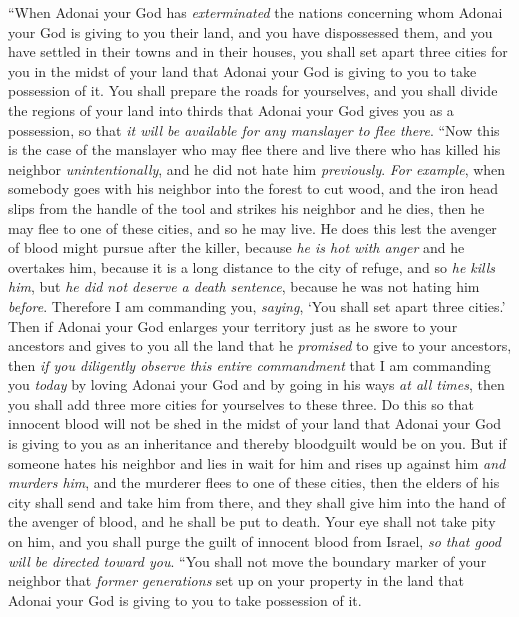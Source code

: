 \begin{biblechapter} %
\verse “When Adonai your God has \textit{exterminated} the nations concerning whom Adonai your God is giving to you their land, and you have dispossessed them, and you have settled in their towns and in their houses,
\verse you shall set apart three cities for you in the midst of your land that Adonai your God is giving to you to take possession of it.
\verse You shall prepare the roads for yourselves, and you shall divide the regions of your land into thirds that Adonai your God gives you as a possession, so that \textit{it will be available for any manslayer to flee there}.
\verse “Now this is the case of the manslayer who may flee there and live there who has killed his neighbor \textit{unintentionally}, and he did not hate him \textit{previously}.
\verse \textit{For example}, when somebody goes with his neighbor into the forest to cut wood, and the iron head slips from the handle of the tool and strikes his neighbor and he dies, then he may flee to one of these cities, and so he may live.
\verse He does this lest the avenger of blood might pursue after the killer, because \textit{he is hot with anger} and he overtakes him, because it is a long distance to the city of refuge, and so \textit{he kills him}, but \textit{he did not deserve a death sentence}, because he was not hating him \textit{before}.
\verse Therefore I am commanding you, \textit{saying}, ‘You shall set apart three cities.’
\verse Then if Adonai your God enlarges your territory just as he swore to your ancestors and gives to you all the land that he \textit{promised} to give to your ancestors,
\verse then \textit{if you diligently observe this entire commandment} that I am commanding you \textit{today} by loving Adonai your God and by going in his ways \textit{at all times}, then you shall add three more cities for yourselves to these three.
\verse Do this so that innocent blood will not be shed in the midst of your land that Adonai your God is giving to you as an inheritance and thereby bloodguilt would be on you.
\verse But if someone hates his neighbor and lies in wait for him and rises up against him \textit{and murders him}, and the murderer flees to one of these cities,
\verse then the elders of his city shall send and take him from there, and they shall give him into the hand of the avenger of blood, and he shall be put to death.
\verse Your eye shall not take pity on him, and you shall purge the guilt of innocent blood from Israel, \textit{so that good will be directed toward you}.
\verse “You shall not move the boundary marker of your neighbor that \textit{former generations} set up on your property in the land that Adonai your God is giving to you to take possession of it.

\end{biblechapter}
